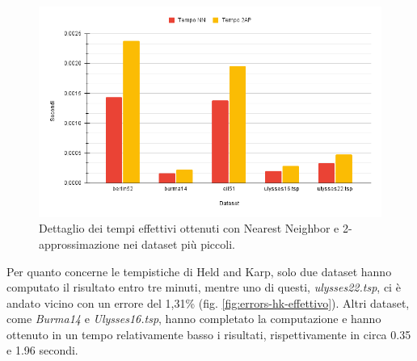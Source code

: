 \begin{figure}[H]
	\centering
	\includegraphics[width=1\textwidth]{res/images/time/time-detail-nn-2ap.png}
	\caption{Dettaglio dei tempi effettivi ottenuti con Nearest Neighbor e 2-approssimazione nei dataset più piccoli.}
	\label{fig:time-detail-nn-2ap}
\end{figure}

Per quanto concerne le tempistiche di Held and Karp, solo due dataset hanno computato il risultato entro tre minuti, mentre uno di questi, \textit{ulysses22.tsp}, ci è andato vicino con un errore del 1,31\% (fig. \ref{fig:errors-hk-effettivo}). Altri dataset, come \textit{Burma14} e \textit{Ulysses16.tsp}, hanno completato la computazione e hanno ottenuto in un tempo relativamente basso i risultati, rispettivamente in circa 0.35 e 1.96 secondi.